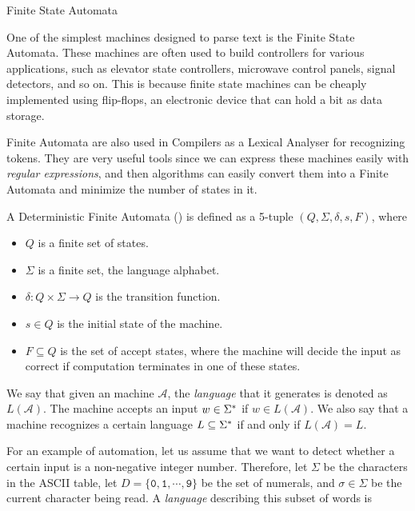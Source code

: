 \begin{section}{Finite State Automata}

One of the simplest machines designed to parse text is the Finite State
Automata. These machines are often used to build controllers for various
applications, such as elevator state controllers, microwave control panels,
signal detectors, and so on. This is because finite state machines can be
cheaply implemented using flip-flops, an electronic device that can hold a bit
as data storage.

Finite Automata are also used in Compilers as a Lexical Analyser for
recognizing tokens.  They are very useful tools since we can express these
machines easily with \textit{regular expressions}, and then algorithms can easily
convert them into a Finite Automata and minimize the number of states in it.

\begin{definition}
A Deterministic Finite Automata () is defined as a 5-tuple
$(Q, \Sigma, \delta, s, F)$, where
\begin{itemize}

\item $Q$ is a finite set of states.
\item $\Sigma$ is a finite set, the language alphabet.
\item $\delta:Q\times\Sigma \longrightarrow Q$ is the transition function.
\item $s \in Q$ is the initial state of the machine.
\item $F \subseteq Q$ is the set of accept states, where the machine will
decide the input as correct if computation terminates in one of these
states.
\end{itemize}
\end{definition}

We say that given an machine $\mathcal{A}$, the \textit{language}
that it generates is denoted as $L(\mathcal{A})$. The machine accepts an input
$w \in \Sigma^*$ if $w \in L(\mathcal{A})$. We also say that a machine
recognizes a certain language $L \subseteq \Sigma^*$ if and only if
$L(\mathcal{A}) = L$.

For an example of automation, let us assume that we want to detect whether a
certain input is a non-negative integer number. Therefore, let $\Sigma$ be the
characters in the ASCII table, let $D = \{\texttt{0}, \texttt{1}, \cdots,
\texttt{9}\}$ be the set of numerals, and $\sigma \in \Sigma$ be the current
character being read. A \textit{language} describing this subset of words
is


\end{section}

